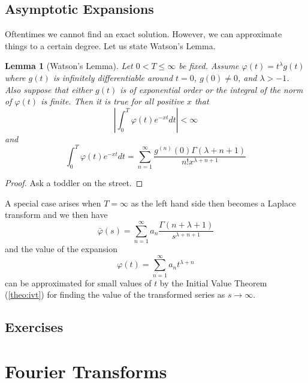 \documentclass{report}
\newtheorem{lemma}[theorem]{Lemma}
\theoremstyle{definition}
\theoremstyle{remark}
\begin{document}
\section{Asymptotic Expansions}
Oftentimes we cannot find an exact solution. However, we can approximate things to a certain degree. Let us state Watson's Lemma.
\begin{lemma}[Watson's Lemma]
    Let $0<T\leq \infty$ be fixed. Assume $\varphi(t)=t^{\lambda}g(t) $ where $g(t)$ is infinitely differentiable around $t=0$, $g(0)\neq 0$, and $\lambda > -1$. Also suppose that either $g(t)$ is of exponential order or the integral of the norm of $\varphi(t)$ is finite. Then it is true for all positive $x$ that 
    \begin{equation*}
        \left| \int^T_0\varphi(t)e^{-xt}dt \right| < \infty
    \end{equation*} 
    and 
    \begin{equation*}
        \int^T_0\varphi(t) e^{-xt}dt = \sum^\infty_{n=1}\frac{g^{(n)}(0)\Gamma(\lambda+n+1)}{n! x^{\lambda+n+1}}
    \end{equation*}
\end{lemma}
\begin{proof}
    Ask a toddler on the street.
\end{proof}

A special case arises when $T=\infty$ as the left hand side then becomes a Laplace transform and we then have 
\begin{equation*}
    \bar \varphi (s) = \sum^\infty_{n=1}a_n\frac{\Gamma(n+\lambda+1)}{s^{\lambda+n+1}}
\end{equation*}
and the value of the expansion 
\begin{equation*}
    \varphi(t) = \sum^\infty_{n=1}a_nt^{\lambda+n}
\end{equation*}
can be approximated for small values of $t$ by the Initial Value Theorem (\ref{theo:ivt}) for finding the value of the transformed series as $s\rightarrow \infty$.
\section{Exercises}







\chapter{Fourier Transforms}
\end{document}
